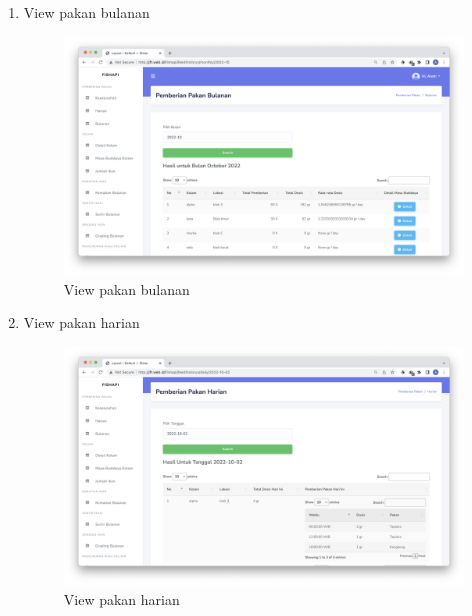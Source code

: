 \begin{enumerate}[1.]
\item View pakan bulanan
\begin{figure}[H]
	\centering
	\includegraphics[width=1\textwidth]{gambar/Sprint02/view_pakan_bulanan}
	\caption{View pakan bulanan}
	\label{fig:view_pakan_bulanan}
\end{figure}
	
\item View pakan harian
\begin{figure}[H]
	\centering
	\includegraphics[width=1\textwidth]{gambar/Sprint02/view_pakan_harian}
	\caption{View pakan harian}
	\label{fig:view_pakan_harian}
\end{figure}
\end{enumerate}